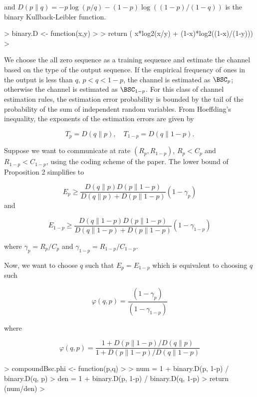 and
$D(p\|q) = -p \log (p/q) - (1-p) \log ( (1-p)/(1-q))$ is the binary
Kullback-Leibler function.

\begin{Schunk}
\begin{Sinput}
> binary.D <- function(x,y)
> {
>   return ( x*log2(x/y) + (1-x)*log2((1-x)/(1-y)))
> }
\end{Sinput}
\end{Schunk}

We choose the all zero sequence as a training sequence and estimate the channel
based on the type of the output sequence. If the empirical frequency of ones in
the output is less than $q$, $p < q < 1-p$, the channel is estimated as
$\BSC_p$; otherwise the channel is estimated as $\BSC_{1-p}$. For this class of
channel estimation rules, the estimation error probability is bounded by the
tail of the probability of the sum of independent random variables. 
From Hoeffding's inequality, the exponents of
the estimation errors are given by

$$T_p = D(q \| p), \quad T_{1-p} = D(q \| 1-p).$$


Suppose we want to communicate at rate $(R_p, R_{1-p})$, $R_p < C_p$
and $R_{1-p} < C_{1-p}$, using the coding scheme of the paper.
The lower bound of Proposition 2 simplifies to

$$E_p ≥ \frac{D(q \| p)   D(p \| 1-p)}
            {D(q\|p) + D(p \| 1-p)} 
            (1-γ_p)                         $$
and

$$E_{1-p} ≥ \frac{D(q \| 1-p) D(p \| 1-p)}
               {D(q\|1-p) + D(p \| 1-p)} 
                (1-γ_{1-p})                 $$

where $γ_p = R_p/C_p$ and $γ_{1-p} = R_{1-p}/C_{1-p}$. 

Now, we want to choose $q$ such that $E_p = E_{1-p}$ which is equivalent to
choosing $q$ such 

$$φ(q,p) = \frac{ (1-γ_p) }{ (1-γ_{1-p}) } $$

where

$$φ(q,p) = \frac{1 + D(p \| 1-p)/D(q\|p)}{1 + D(p \| 1-p)/D(q\|1-p) } $$

\begin{Schunk}
\begin{Sinput}
> compoundBsc.phi <- function(p,q)
> {
>   num = 1 + binary.D(p, 1-p) / binary.D(q, p)
>   den = 1 + binary.D(p, 1-p) / binary.D(q, 1-p)
>   return (num/den)
> }
\end{Sinput}
\end{Schunk}

